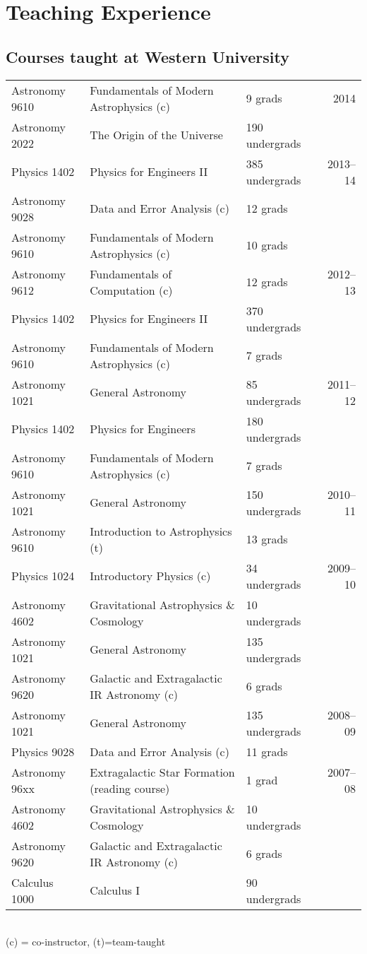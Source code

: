 \documentclass[12pt]{article}
\begin{document}
\section{Teaching Experience}

\subsection{Courses taught at Western University}
\begin{tabularx}{\textwidth}{lXlr}
Astronomy 9610& Fundamentals of Modern Astrophysics (c) & 9 grads& 2014\\  
Astronomy 2022& The Origin of the Universe & 190 undergrads& \\  
Physics 1402 & Physics for Engineers II &  385 undergrads & 2013--14\\ 
Astronomy 9028& Data and Error Analysis (c) & 12 grads&\\ 
Astronomy 9610& Fundamentals of Modern Astrophysics (c) & 10 grads&\\  
Astronomy 9612& Fundamentals of Computation (c) & 12 grads&2012--13\\
Physics 1402& Physics for Engineers II &  370 undergrads&\\ 
Astronomy 9610&  Fundamentals of Modern Astrophysics (c) & 7 grads&\\ 
Astronomy 1021& General Astronomy & 85 undergrads&2011--12\\  
Physics 1402& Physics for Engineers &  180 undergrads&\\ 
Astronomy 9610& Fundamentals of Modern Astrophysics (c) & 7 grads&\\  
Astronomy 1021& General Astronomy & 150 undergrads&2010--11\\  
Astronomy 9610& Introduction to Astrophysics (t) & 13 grads&\\  
Physics 1024& Introductory Physics (c)  & 34 undergrads&2009--10\\ 
Astronomy 4602& Gravitational Astrophysics \& Cosmology & 10 undergrads&\\  
Astronomy 1021& General Astronomy & 135 undergrads&\\  
Astronomy 9620& Galactic and Extragalactic IR Astronomy (c) & 6 grads&\\
Astronomy 1021& General Astronomy & 135 undergrads& 2008--09\\ 
Physics 9028& Data and Error Analysis (c) &  11 grads&\\ 
Astronomy 96xx& Extragalactic Star Formation (reading course) & 1 grad& 2007--08\\ 
Astronomy 4602& Gravitational Astrophysics \& Cosmology & 10  undergrads&\\ 
Astronomy 9620& Galactic and Extragalactic IR Astronomy (c) & 6 grads&\\
Calculus 1000& Calculus I & 90 undergrads&\\
\end{tabularx}\\
\vspace{0.3cm}
(c) = co-instructor, (t)=team-taught
\end{document}
